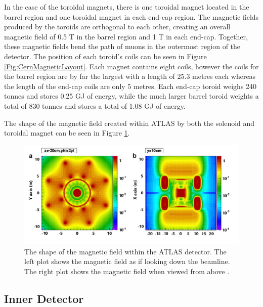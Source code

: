 \documentclass[12pt,a4paper,epsf,portrait,times,epsfig]{report}
\begin{document}
		In the case of the toroidal magnets, there is one toroidal magnet located in the barrel region and one toroidal magnet in each end-cap region. The magnetic fields produced by the toroids are orthogonal to each other, creating an overall magnetic field of 0.5 T in the barrel region and 1 T in each end-cap. Together, these magnetic fields bend the path of muons in the outermost region of the detector. The position of each toroid's coils can be seen in Figure \ref{Fig:CernMagneticLayout}. Each magnet contains eight coils, however the coils for the barrel region are by far the largest with a length of 25.3 metres each whereas the length of the end-cap coils are only 5 metres. Each end-cap toroid weighs 240 tonnes and stores 0.25 GJ of energy, while the much larger barrel toroid weights a total of 830 tonnes and stores a total of 1.08 GJ of energy. 
		
		The shape of the magnetic field created within ATLAS by both the solenoid and toroidal magnet can be seen in Figure \ref{Fig:CernMagneticField}. 
		
		\begin{figure}
			\centering
			\includegraphics[scale=0.4]{Magnetic_Field}
			\caption{The shape of the magnetic field within the ATLAS detector. The left plot shows the magnetic field as if looking down the beamline. The right plot shows the magnetic field when viewed from above \cite{Article:CernMagnets}. }
			\label{Fig:CernMagneticField}
		\end{figure}


		\subsection{Inner Detector}\label{Section:InnerDetector}
\end{document}
